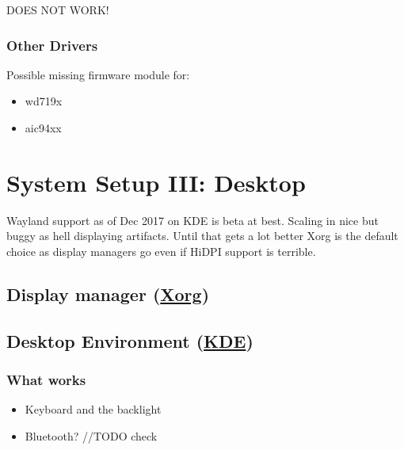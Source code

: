 DOES NOT WORK!


\subsubsection{Other Drivers}

Possible missing firmware module for:
\begin{itemize}[noitemsep,topsep=0pt,leftmargin=*]
    \item wd719x
    \item aic94xx
\end{itemize}


\section{System Setup III: Desktop}

Wayland support as of Dec 2017 on KDE is beta at best. Scaling in nice but buggy as hell displaying artifacts. Until that gets a lot better Xorg is the default choice as display managers go even if HiDPI support is terrible. 

\subsection{Display manager (\href{https://wiki.archlinux.org/index.php/xorg}{Xorg})}


\subsection{Desktop Environment (\href{https://wiki.archlinux.org/index.php/KDE}{KDE})}

\subsubsection{What works}

\begin{itemize}[noitemsep,topsep=0pt,leftmargin=*]
    \item Keyboard and the backlight
    \item Bluetooth? //TODO check
\end{itemize}

